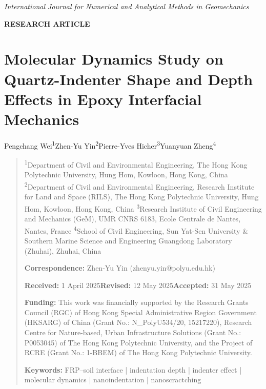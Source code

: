 \documentclass{article}
\begin{document}

\noindent\emph{International Journal for Numerical and Analytical Methods in Geomechanics}\par
\medskip
\noindent\textbf{RESEARCH ARTICLE}\par

\section*{Molecular Dynamics Study on Quartz-Indenter Shape and Depth Effects in Epoxy Interfacial Mechanics}

\noindent Pengchang Wei\textsuperscript{1}\quad Zhen-Yu Yin\textsuperscript{2}\quad Pierre-Yves Hicher\textsuperscript{3}\quad Yuanyuan Zheng\textsuperscript{4}

\begin{quote}\small
\noindent \textsuperscript{1}Department of Civil and Environmental Engineering, The Hong Kong Polytechnic University, Hung Hom, Kowloon, Hong Kong, China \textsuperscript{2}Department of Civil and Environmental Engineering, Research Institute for Land and Space (RILS), The Hong Kong Polytechnic University, Hung Hom, Kowloon, Hong Kong, China \textsuperscript{3}Research Institute of Civil Engineering and Mechanics (GeM), UMR CNRS 6183, Ecole Centrale de Nantes, Nantes, France \textsuperscript{4}School of Civil Engineering, Sun Yat-Sen University \& Southern Marine Science and Engineering Guangdong Laboratory (Zhuhai), Zhuhai, China

\medskip
\noindent \textbf{Correspondence:} Zhen-Yu Yin (zhenyu.yin@polyu.edu.hk)

\medskip
\noindent \textbf{Received:} 1 April 2025\quad \textbf{Revised:} 12 May 2025\quad \textbf{Accepted:} 31 May 2025

\medskip
\noindent \textbf{Funding:} This work was financially supported by the Research Grants Council (RGC) of Hong Kong Special Administrative Region Government (HKSARG) of China (Grant No.: N\_PolyU534/20, 15217220), Research Centre for Nature-based, Urban Infrastructure Solutions (Grant No.: P0053045) of The Hong Kong Polytechnic University, and the Project of RCRE (Grant No.: 1-BBEM) of The Hong Kong Polytechnic University.

\medskip
\noindent \textbf{Keywords:} FRP–soil interface | indentation depth | indenter effect | molecular dynamics | nanoindentation | nanoscractching
\end{quote}
\end{document}
